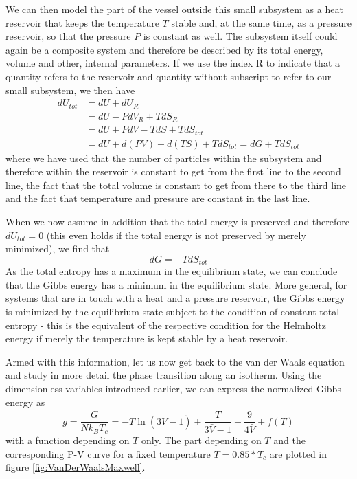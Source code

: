 \documentclass[a4paper, draft]{report}
\numberwithin{section}{chapter}
\numberwithin{equation}{chapter}
\theoremstyle{own}
\theoremstyle{remark}
\begin{document}
We can then model the part of the vessel outside this small subsystem as a heat reservoir that keeps the temperature $T$ stable and, at the same time, as a pressure reservoir, so that the pressure $P$ is constant as well. The subsystem itself could again be a composite system and therefore be described by its total energy, volume and other, internal parameters. If we use the index R to indicate that a quantity refers to the reservoir and quantity without subscript to refer to our small subsystem, we then have
\begin{align*}
dU_{tot} &= dU + dU_R  \\
&= dU - P dV_R + T dS_R \\
&= dU + P dV - T dS + T dS_{tot} \\
&= dU + d(PV) - d(TS) + TdS_{tot} = dG + TdS_{tot}
\end{align*}
where we have used that the number of particles within the subsystem and therefore within the reservoir is constant to get from the first line to the second line, the fact that the total volume is constant to get from there to the third line and the fact that temperature and pressure are constant in the last line.

When we now assume in addition that the total energy is preserved and therefore $dU_{tot} = 0$ (this even holds if the total energy is not preserved by merely minimized), we find that 
$$
dG = - T dS_{tot}
$$
As the total entropy has a maximum in the equilibrium state, we can conclude that the Gibbs energy has a minimum in the equilibrium state. More general, for systems that are in touch with a heat and a pressure reservoir, the Gibbs energy is minimized by the equilibrium state subject to the condition of constant total entropy - this is the equivalent of the respective condition for the Helmholtz energy if merely the temperature is kept stable by a heat reservoir.

Armed with this information, let us now get back to the van der Waals equation and study in more detail the phase transition along an isotherm. Using the dimensionless variables introduced earlier, we can express the normalized Gibbs energy as
$$
g = \frac{G}{N k_B T_c} = - \bar{T} \ln (3\bar{V} - 1) 
+  \frac{\bar{T}}{3\bar{V} - 1} - \frac{9}{4 \bar{V}} + f(T)
$$
with a function depending on $T$ only. The part depending on $T$ and the corresponding P-V curve for a fixed temperature $T = 0.85*T_c$ are plotted in figure \ref{fig:VanDerWaalsMaxwell}.
\end{document}
